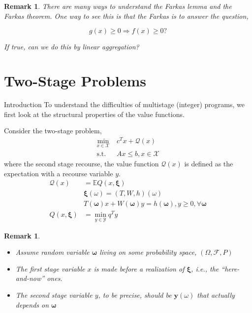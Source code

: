\documentclass{beamerswitch}
\newcommand{\st}{\mathrm{s.t.\;}}
\newcommand{\ex}{\mathbb E}
\newcommand{\bxi}{\bm \xi}
\newcommand{\bo}{\bm \omega}
\newtheorem{remark}[thm]{Remark}
\begin{document}
\begin{remark}
    There are many ways to understand the Farkas lemma and the Farkas theorem. One way to see this is that the Farkas is to answer the question,

    \[g(x) \ge 0 \Rightarrow f(x) \ge 0?\]

    If true, can we do this by linear aggregation?
\end{remark}

\section{Two-Stage Problems}

\begin{frame}[allowframebreaks]{Introduction}
    To understand the difficulties of multistage (integer) programs, we first look at the structural properties of the value functions.

    Consider the two-stage problem,
    \begin{align*}
        \min_{x \in \mathcal X }~ & c^T x+ \mathcal Q (x)        \\
        \st                       & A x \leq b, x \in \mathcal X
    \end{align*}
    where the second stage recourse, the value function \(\mathcal Q (x) \) is defined as the expectation with a recourse variable \(y\).
    \begin{align*}
        \mathcal Q (x) & = \ex Q(x, \bxi)                                \\
                       & \bxi(\omega)    = (T, W, h )(\omega)            \\
                       & T(\bo) x+W(\bo) y=h(\bo), y \geq 0, \forall \bo \\
        Q(x, \bxi)     & = \min_{y \in \mathcal Y} q^T y
    \end{align*}

    \begin{remark}
        \begin{itemize}
            \item Assume random variable \(\bo \) living on some probability space, \((\Omega,\mathcal F, P)\)
            \item The first stage variable \(x\) is made before a realization of \(\bxi\), i.e., the ``here-and-now'' ones.
            \item The second stage variable \(y\), to be precise, should be \(\bm y(\omega)\) that actually depends on \(\bo\)
        \end{itemize}
    \end{remark}
\end{frame}
\end{document}
